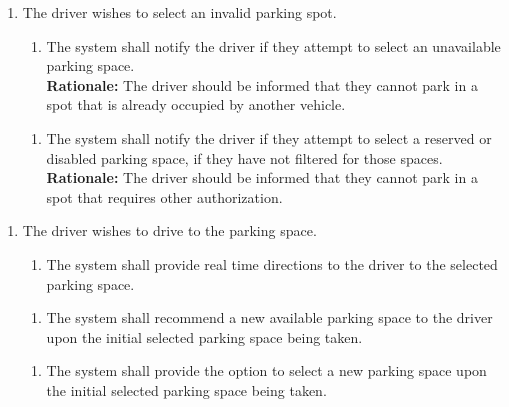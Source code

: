 \documentclass[12pt,letterpaper]{article}
\newcounter{businesseventnum}
\newcounter{funcreqnum}
\begin{document}
\begin{enumerate}[{BE}\thebusinesseventnum.] 
\item The driver wishes to select an invalid parking spot.
\begin{enumerate}[{FR}\thefuncreqnum.] 
    \item The system shall notify the driver if they attempt to select an unavailable parking space.\\
    \textbf{Rationale:} The driver should be informed that they cannot park in a spot that is already occupied by another vehicle.
\end{enumerate}
\begin{enumerate}[{FR}\thefuncreqnum.] 
    \item The system shall notify the driver if they attempt to select a reserved or disabled parking space, if they have not filtered for those spaces.\\
    \textbf{Rationale:} The driver should be informed that they cannot park in a spot that requires other authorization.
\end{enumerate}
\end{enumerate}

\begin{enumerate}[{BE}\thebusinesseventnum.] 
\item The driver wishes to drive to the parking space.
\begin{enumerate}[{FR}\thefuncreqnum.] 
    \item The system shall provide real time directions to the driver to the selected parking space.
\end{enumerate}
\begin{enumerate}[{FR}\thefuncreqnum.] 
    \item The system shall recommend a new available parking space to the driver upon the initial selected parking space being taken.
\end{enumerate}
\begin{enumerate}[{FR}\thefuncreqnum.] 
    \item The system shall provide the option to select a new parking space upon the initial selected parking space being taken.
\end{enumerate}
\end{enumerate}
\end{document}
